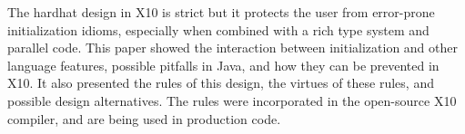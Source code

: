 The hardhat design in X10 is strict but it protects the user from
    error-prone initialization idioms,
    especially when combined with a rich type system and parallel code.
This paper showed the interaction between initialization and other language features,
    possible pitfalls in Java,
    and how they can be prevented in X10.
It also presented the rules of this design,
    the virtues of these rules,
    and possible design alternatives.
The rules were incorporated in the open-source X10 compiler,
    and are being used in production code.
